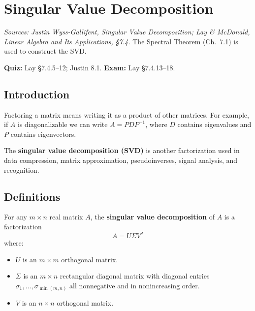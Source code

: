 \chapter{Singular Value Decomposition}

\noindent\textit{Sources: Justin Wyss-Gallifent, \textit{Singular Value Decomposition}; Lay \& McDonald, \textit{Linear Algebra and Its Applications}, \S7.4.} The Spectral Theorem (Ch.~7.1) is used to construct the SVD.

\begin{remark}
\textbf{Quiz:} Lay \S7.4.5--12; Justin 8.1. \textbf{Exam:} Lay \S7.4.13--18.
\end{remark}

\section{Introduction}

Factoring a matrix means writing it as a product of other matrices. For example, if $A$ is diagonalizable we can write $A=PDP^{-1}$, where $D$ contains eigenvalues and $P$ contains eigenvectors.

The \textbf{singular value decomposition (SVD)} is another factorization used in data compression, matrix approximation, pseudoinverses, signal analysis, and recognition.

\section{Definitions}

\begin{definition}
For any $m\times n$ real matrix $A$, the \textbf{singular value decomposition} of $A$ is a factorization
\[
A = U\Sigma V^T
\]
where:
\begin{itemize}
  \item $U$ is an $m\times m$ orthogonal matrix.
  \item $\Sigma$ is an $m\times n$ rectangular diagonal matrix with diagonal entries $\sigma_1,\ldots,\sigma_{\min(m,n)}$ all nonnegative and in nonincreasing order.
  \item $V$ is an $n\times n$ orthogonal matrix.
\end{itemize}
\end{definition}

